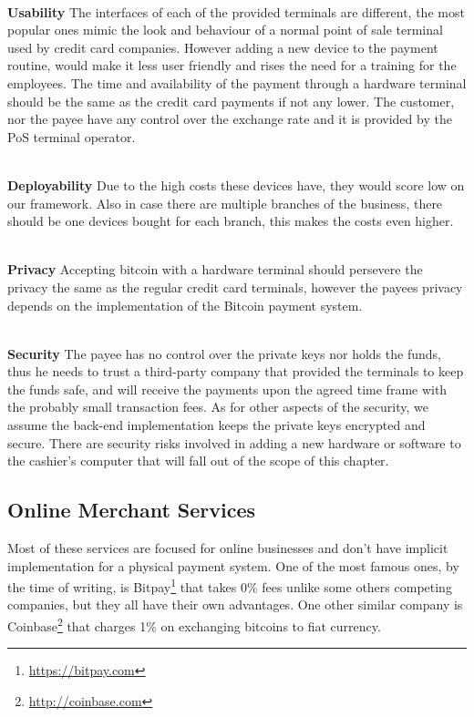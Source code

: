 \\\textbf{Usability}
The interfaces of each of the provided terminals are different, the most popular ones mimic the look and behaviour of a normal point of sale terminal used by credit card companies. However adding a new device to the payment routine, would make it less user friendly and rises the need for a training for the employees. The time and availability of the payment through a hardware terminal should be the same as the credit card payments if not any lower. The customer, nor the payee have any control over the exchange rate and it is provided by the PoS terminal operator.

\\\textbf{Deployability}
Due to the high costs these devices have, they would score low on our framework. Also in case there are multiple branches of the business, there should be one devices bought for each branch, this makes the costs even higher.

\\\textbf{Privacy}
Accepting bitcoin with a hardware terminal should persevere the privacy the same as the regular credit card terminals, however the payees privacy depends on the implementation of the Bitcoin payment system. 

\\\textbf{Security}
The payee has no control over the private keys nor holds the funds, thus he needs to trust a third-party company that provided the terminals to keep the funds safe, and will receive the payments upon the agreed time frame with the probably small transaction fees. As for other aspects of the security, we assume the back-end implementation keeps the private keys encrypted and secure. There are security risks involved in adding a new hardware or software to the cashier's computer that will fall out of the scope of this chapter.

\subsection{Online Merchant Services}
Most of these services are focused for online businesses and don't have implicit implementation for a physical payment system. 
One of the most famous ones, by the time of writing, is Bitpay\footnote{\url{https://bitpay.com}} that takes 0\% fees unlike some others competing companies, but they all have their own advantages. One other similar company is Coinbase\footnote{\url{http://coinbase.com}} that charges 1\% on exchanging bitcoins to fiat currency.

